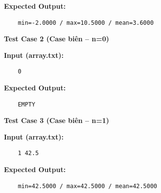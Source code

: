     \textbf{Expected Output:}
    \begin{lstlisting}
    min=-2.0000 / max=10.5000 / mean=3.6000\end{lstlisting}

    \vspace{0.5cm}

    \textbf{Test Case 2 (Case biên -- n=0)}

    \textbf{Input (array.txt):}
    \begin{lstlisting}
    0\end{lstlisting}

    \textbf{Expected Output:}
    \begin{lstlisting}
    EMPTY\end{lstlisting}
    \textbf{Test Case 3 (Case biên -- n=1)}

    \textbf{Input (array.txt):}
    \begin{lstlisting}
    1 42.5\end{lstlisting}

    \textbf{Expected Output:}
    \begin{lstlisting}
    min=42.5000 / max=42.5000 / mean=42.5000\end{lstlisting}